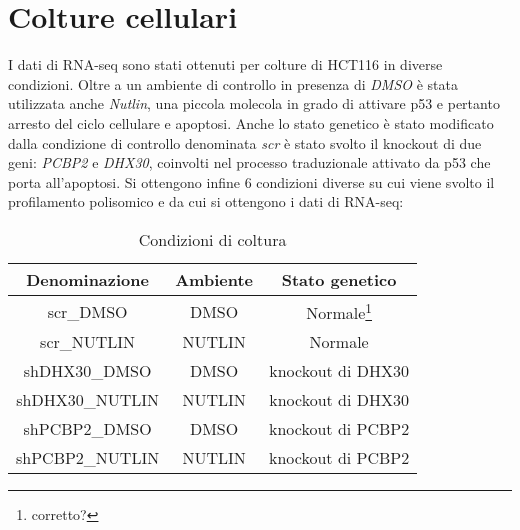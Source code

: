 \section{Colture cellulari}
I dati di RNA-seq sono stati ottenuti per colture di HCT116 in diverse condizioni.
Oltre a un ambiente di controllo in presenza di \emph{DMSO} \`e stata utilizzata anche \emph{Nutlin}, una piccola molecola in grado di attivare p53 e pertanto arresto del ciclo cellulare e apoptosi.
Anche lo stato genetico \`e stato modificato dalla condizione di controllo denominata \emph{scr} \`e stato svolto il knockout di due geni: \emph{PCBP2} e \emph{DHX30}, coinvolti nel processo traduzionale attivato da p53 che porta all'apoptosi.
Si ottengono infine $6$ condizioni diverse su cui viene svolto il profilamento polisomico e da cui si ottengono i dati di RNA-seq:
\begin{table}[H]
  \begin{tabular}{|c|c|c|}
    \hline
    Denominazione & Ambiente & Stato genetico\\
    \hline
    scr\_DMSO & DMSO & Normale\footnote{corretto?}\\
    \hline
    scr\_NUTLIN & NUTLIN & Normale\\
    \hline
    shDHX30\_DMSO & DMSO & knockout di DHX30\\
    \hline
    shDHX30\_NUTLIN & NUTLIN & knockout di DHX30\\
    \hline
    shPCBP2\_DMSO & DMSO & knockout di PCBP2\\
    \hline
    shPCBP2\_NUTLIN & NUTLIN & knockout di PCBP2\\
    \hline
  \end{tabular}
  \centering
  \caption{Condizioni di coltura}
  \label{tab:concolture}
\end{table}


